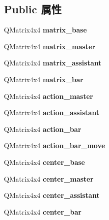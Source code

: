 \subsection*{Public 属性}
\begin{DoxyCompactItemize}
\item 
\hypertarget{class_model_a2af08d9c5e61fd4db1fce69ce2badabd}{}Q\+Matrix4x4 {\bfseries matrix\+\_\+base}\label{class_model_a2af08d9c5e61fd4db1fce69ce2badabd}

\item 
\hypertarget{class_model_aea525ae8dde333edf43ea29b64e23b09}{}Q\+Matrix4x4 {\bfseries matrix\+\_\+master}\label{class_model_aea525ae8dde333edf43ea29b64e23b09}

\item 
\hypertarget{class_model_aa93bced170459938899a816b8c50455b}{}Q\+Matrix4x4 {\bfseries matrix\+\_\+assistant}\label{class_model_aa93bced170459938899a816b8c50455b}

\item 
\hypertarget{class_model_a2cd241b7146cb659f1cd8e7109dd1cd9}{}Q\+Matrix4x4 {\bfseries matrix\+\_\+bar}\label{class_model_a2cd241b7146cb659f1cd8e7109dd1cd9}

\item 
\hypertarget{class_model_a2a0261ebfb0fdd46a242cded0b387d6c}{}Q\+Matrix4x4 {\bfseries action\+\_\+master}\label{class_model_a2a0261ebfb0fdd46a242cded0b387d6c}

\item 
\hypertarget{class_model_abcf0721253ac3ac8239706fb10c14f6a}{}Q\+Matrix4x4 {\bfseries action\+\_\+assistant}\label{class_model_abcf0721253ac3ac8239706fb10c14f6a}

\item 
\hypertarget{class_model_a1b619194a4f3693f567ba793cfefaea1}{}Q\+Matrix4x4 {\bfseries action\+\_\+bar}\label{class_model_a1b619194a4f3693f567ba793cfefaea1}

\item 
\hypertarget{class_model_ad7bdcd7f21a340816db7dd8d5e34f3e0}{}Q\+Matrix4x4 {\bfseries action\+\_\+bar\+\_\+move}\label{class_model_ad7bdcd7f21a340816db7dd8d5e34f3e0}

\item 
\hypertarget{class_model_a8666c9508a3b652b291da8a4eb7198fa}{}Q\+Matrix4x4 {\bfseries center\+\_\+base}\label{class_model_a8666c9508a3b652b291da8a4eb7198fa}

\item 
\hypertarget{class_model_a91a1c012411db17700647dd3b67ca885}{}Q\+Matrix4x4 {\bfseries center\+\_\+master}\label{class_model_a91a1c012411db17700647dd3b67ca885}

\item 
\hypertarget{class_model_afc99744645ea3447cb75be2c3c2addcc}{}Q\+Matrix4x4 {\bfseries center\+\_\+assistant}\label{class_model_afc99744645ea3447cb75be2c3c2addcc}

\item 
\hypertarget{class_model_a38dfc1bbb85eb6558ba212efcd2819af}{}Q\+Matrix4x4 {\bfseries center\+\_\+bar}\label{class_model_a38dfc1bbb85eb6558ba212efcd2819af}

\end{DoxyCompactItemize}


